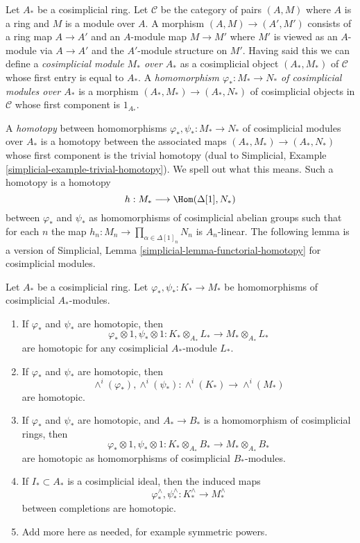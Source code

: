\medskip\noindent
Let $A_*$ be a cosimplicial ring. Let $\mathcal{C}$ be the category
of pairs $(A, M)$ where $A$ is a ring and $M$ is a module over $A$.
A morphism $(A, M) \to (A', M')$ consists of a ring map $A \to A'$ and
an $A$-module map $M \to M'$ where $M'$ is viewed as an $A$-module
via $A \to A'$ and the $A'$-module structure on $M'$. Having said this
we can define a {\it cosimplicial module $M_*$ over $A_*$} as a cosimplicial
object $(A_*, M_*)$ of $\mathcal{C}$ whose first entry is equal to $A_*$.
A {\it homomorphism $\varphi_* : M_* \to N_*$ of cosimplicial modules over
$A_*$} is a morphism $(A_*, M_*) \to (A_*, N_*)$ of cosimplicial objects
in $\mathcal{C}$ whose first component is $1_{A_*}$.

\medskip\noindent
A {\it homotopy} between homomorphisms $\varphi_*, \psi_* : M_* \to N_*$
of cosimplicial modules over $A_*$ is a homotopy between the associated
maps $(A_*, M_*) \to (A_*, N_*)$ whose first component is the
trivial homotopy (dual to
Simplicial, Example \ref{simplicial-example-trivial-homotopy}).
We spell out what this means. Such a homotopy is a homotopy
$$
h : M_* \longrightarrow \Hom(\Delta[1], N_*)
$$
between $\varphi_*$ and $\psi_*$ as homomorphisms of cosimplicial abelian
groups such that for each $n$ the map
$h_n : M_n \to \prod_{\alpha \in \Delta[1]_n} N_n$ is $A_n$-linear.
The following lemma is a version of
Simplicial, Lemma \ref{simplicial-lemma-functorial-homotopy}
for cosimplicial modules.

\begin{lemma}
\label{lemma-homotopy-tensor}
Let $A_*$ be a cosimplicial ring. Let $\varphi_*, \psi_* : K_* \to M_*$
be homomorphisms of cosimplicial $A_*$-modules.
\begin{enumerate}
\item
\label{item-tensor}
If $\varphi_*$ and $\psi_*$ are homotopic, then
$$
\varphi_* \otimes 1, \psi_* \otimes 1 :
K_* \otimes_{A_*} L_* \longrightarrow M_* \otimes_{A_*} L_*
$$
are homotopic for any cosimplicial $A_*$-module $L_*$.
\item
\label{item-wedge}
If $\varphi_*$ and $\psi_*$ are homotopic, then
$$
\wedge^i(\varphi_*), \wedge^i(\psi_*) :
\wedge^i(K_*) \longrightarrow \wedge^i(M_*)
$$
are homotopic.
\item
\label{item-base-change}
If $\varphi_*$ and $\psi_*$ are homotopic, and $A_* \to B_*$
is a homomorphism of cosimplicial rings, then
$$
\varphi_* \otimes 1, \psi_* \otimes 1 :
K_* \otimes_{A_*} B_* \longrightarrow M_* \otimes_{A_*} B_*
$$
are homotopic as homomorphisms of cosimplicial $B_*$-modules.
\item
\label{item-completion}
If $I_* \subset A_*$ is a cosimplicial ideal, then the induced
maps
$$
\varphi^\wedge_*, \psi^\wedge_* :
K_*^\wedge \longrightarrow M_*^\wedge
$$
between completions are homotopic.
\item Add more here as needed, for example symmetric powers.
\end{enumerate}
\end{lemma}

